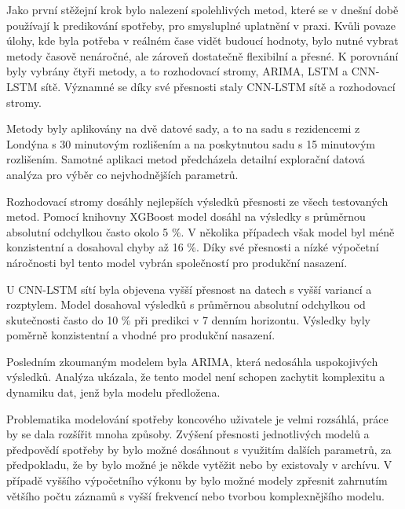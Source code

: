 \documentclass[FM,BP,fonts]{tulthesis}
\begin{document}
Jako první stěžejní krok bylo nalezení spolehlivých metod, které se v dnešní době používají k predikování spotřeby, pro smysluplné uplatnění v praxi. Kvůli povaze úlohy, kde byla potřeba v reálném čase vidět budoucí hodnoty, bylo nutné vybrat metody časově nenáročné, ale zároveň dostatečně flexibilní a přesné. K porovnání byly vybrány čtyři metody, a to rozhodovací stromy, ARIMA, LSTM a CNN-LSTM sítě. Významné se díky své přesnosti staly CNN-LSTM sítě a rozhodovací stromy.

Metody byly aplikovány na dvě datové sady, a to na sadu s rezidencemi z Londýna s 30 minutovým rozlišením a na poskytnutou sadu s 15 minutovým rozlišením. Samotné aplikaci metod předcházela detailní explorační datová analýza pro výběr co nejvhodnějších parametrů.

Rozhodovací stromy dosáhly nejlepších výsledků přesnosti ze všech testovaných metod. Pomocí knihovny XGBoost model dosáhl na výsledky s průměrnou absolutní odchylkou často okolo 5 \%. V několika případech však model byl méně konzistentní a dosahoval chyby až 16 \%. Díky své přesnosti a nízké výpočetní náročnosti byl tento model vybrán společností pro produkční nasazení.

U CNN-LSTM sítí byla objevena vyšší přesnost na datech s vyšší variancí a rozptylem. Model dosahoval výsledků s průměrnou absolutní odchylkou od skutečnosti často do 10 \% při predikci v 7 denním horizontu. Výsledky byly poměrně konzistentní a vhodné pro produkční nasazení.


Posledním zkoumaným modelem byla ARIMA, která nedosáhla uspokojivých výsledků. Analýza ukázala, že tento model není schopen zachytit komplexitu a dynamiku dat, jenž byla modelu předložena.

Problematika modelování spotřeby koncového uživatele je velmi rozsáhlá, práce by se dala rozšířit mnoha způsoby. Zvýšení přesnosti jednotlivých modelů a předpovědí spotřeby by bylo možné dosáhnout s využitím dalších parametrů, za předpokladu, že by bylo možné je někde vytěžit nebo by existovaly v archívu. V případě vyššího výpočetního výkonu by bylo možné modely zpřesnit zahrnutím většího počtu záznamů s vyšší frekvencí nebo tvorbou komplexnějšího modelu.


\printbibliography[title={Použitá literatura}] %

\end{document}
